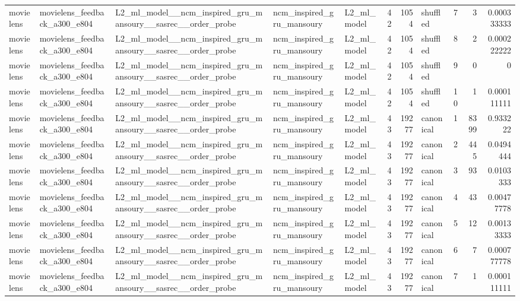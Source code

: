 \begin{table}[htbp!]
\begin{tabular}{lllllrrlrrr}
movielens & movielens\_feedback\_a300\_e804 & L2\_ml\_model\_\_ncm\_inspired\_gru\_mansoury\_\_sasrec\_\_order\_probe & ncm\_inspired\_gru\_mansoury & L2\_ml\_model & 42 & 1054 & shuffled & 7 & 3 & 0.000333333 \\
movielens & movielens\_feedback\_a300\_e804 & L2\_ml\_model\_\_ncm\_inspired\_gru\_mansoury\_\_sasrec\_\_order\_probe & ncm\_inspired\_gru\_mansoury & L2\_ml\_model & 42 & 1054 & shuffled & 8 & 2 & 0.000222222 \\
movielens & movielens\_feedback\_a300\_e804 & L2\_ml\_model\_\_ncm\_inspired\_gru\_mansoury\_\_sasrec\_\_order\_probe & ncm\_inspired\_gru\_mansoury & L2\_ml\_model & 42 & 1054 & shuffled & 9 & 0 & 0 \\
movielens & movielens\_feedback\_a300\_e804 & L2\_ml\_model\_\_ncm\_inspired\_gru\_mansoury\_\_sasrec\_\_order\_probe & ncm\_inspired\_gru\_mansoury & L2\_ml\_model & 42 & 1054 & shuffled & 10 & 1 & 0.000111111 \\
movielens & movielens\_feedback\_a300\_e804 & L2\_ml\_model\_\_ncm\_inspired\_gru\_mansoury\_\_sasrec\_\_order\_probe & ncm\_inspired\_gru\_mansoury & L2\_ml\_model & 43 & 19277 & canonical & 1 & 8399 & 0.933222 \\
movielens & movielens\_feedback\_a300\_e804 & L2\_ml\_model\_\_ncm\_inspired\_gru\_mansoury\_\_sasrec\_\_order\_probe & ncm\_inspired\_gru\_mansoury & L2\_ml\_model & 43 & 19277 & canonical & 2 & 445 & 0.0494444 \\
movielens & movielens\_feedback\_a300\_e804 & L2\_ml\_model\_\_ncm\_inspired\_gru\_mansoury\_\_sasrec\_\_order\_probe & ncm\_inspired\_gru\_mansoury & L2\_ml\_model & 43 & 19277 & canonical & 3 & 93 & 0.0103333 \\
movielens & movielens\_feedback\_a300\_e804 & L2\_ml\_model\_\_ncm\_inspired\_gru\_mansoury\_\_sasrec\_\_order\_probe & ncm\_inspired\_gru\_mansoury & L2\_ml\_model & 43 & 19277 & canonical & 4 & 43 & 0.00477778 \\
movielens & movielens\_feedback\_a300\_e804 & L2\_ml\_model\_\_ncm\_inspired\_gru\_mansoury\_\_sasrec\_\_order\_probe & ncm\_inspired\_gru\_mansoury & L2\_ml\_model & 43 & 19277 & canonical & 5 & 12 & 0.00133333 \\
movielens & movielens\_feedback\_a300\_e804 & L2\_ml\_model\_\_ncm\_inspired\_gru\_mansoury\_\_sasrec\_\_order\_probe & ncm\_inspired\_gru\_mansoury & L2\_ml\_model & 43 & 19277 & canonical & 6 & 7 & 0.000777778 \\
movielens & movielens\_feedback\_a300\_e804 & L2\_ml\_model\_\_ncm\_inspired\_gru\_mansoury\_\_sasrec\_\_order\_probe & ncm\_inspired\_gru\_mansoury & L2\_ml\_model & 43 & 19277 & canonical & 7 & 1 & 0.000111111 \\

\end{tabular}
\end{table}
